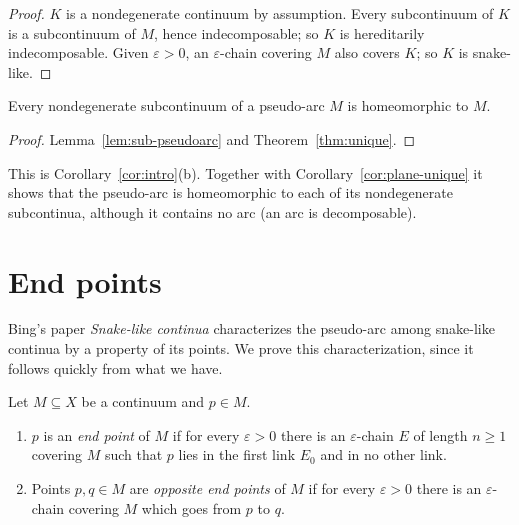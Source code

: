 \begin{proof}
$K$ is a nondegenerate continuum by assumption. Every subcontinuum of $K$ is a subcontinuum of
$M$, hence indecomposable; so $K$ is hereditarily indecomposable. Given $\varepsilon>0$, an
$\varepsilon$-chain covering $M$ also covers $K$; so $K$ is snake-like.
\end{proof}


\begin{corollary}\label{cor:sub-homeo}
Every nondegenerate subcontinuum of a pseudo-arc $M$ is homeomorphic to $M$.
\end{corollary}

\begin{proof}
Lemma~\ref{lem:sub-pseudoarc} and Theorem~\ref{thm:unique}.
\end{proof}


This is Corollary~\ref{cor:intro}(b). Together with Corollary~\ref{cor:plane-unique} it shows
that the pseudo-arc is homeomorphic to each of its nondegenerate subcontinua, although it
contains no arc (an arc is decomposable).

\section{End points}\label{sec:main-endpoints}

Bing's paper \emph{Snake-like continua} characterizes the pseudo-arc among snake-like continua by
a property of its points. We prove this characterization, since it follows quickly from what we
have.

\begin{definition}\label{def:endpoint}
Let $M\subseteq X$ be a continuum and $p\in M$.
\begin{enumerate}[label=(\alph*)]
\item $p$ is an \emph{end point} of $M$ if for every $\varepsilon>0$ there is an $\varepsilon$-chain $E$ of
length $n\ge1$ covering $M$ such that $p$ lies in the first link $E_0$ and in no other link.
\item Points $p,q\in M$ are \emph{opposite end points} of $M$ if for every $\varepsilon>0$ there is an
$\varepsilon$-chain covering $M$ which goes from $p$ to $q$.
\end{enumerate}
\end{definition}

